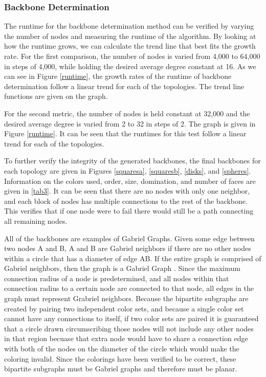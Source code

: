 \documentclass{article}
\begin{document}
        \subsubsection{Backbone Determination}
        The runtime for the backbone determination method can be verified by varying the number of nodes and measuring the runtime of the algorithm. By looking at how the runtime grows, we can calculate the trend line that best fits the growth rate. For the first comparison, the number of nodes is varied from 4,000 to 64,000 in steps of 4,000, while holding the desired average degree constant at 16. As we can see in Figure \ref{runtime}, the growth rates of the runtime of backbone determination follow a linear trend for each of the topologies. The trend line functions are given on the graph.
        \par
        For the second metric, the number of nodes is held constant at 32,000 and the desired average degree is varied from 2 to 32 in steps of 2. The graph is given in Figure \ref{runtime}. It can be seen that the runtimes for this test follow a linear trend for each of the topologies.
        \par
        To further verify the integrity of the generated backbones, the final backbones for each topology are given in Figures \ref{squaresa}, \ref{squaresb}, \ref{disks}, and \ref{spheres}. Information on the colors used, order, size, domination, and number of faces are given in \ref{tab3}. It can be seen that there are no nodes with only one neighbor, and each block of nodes has multiple connections to the rest of the backbone. This verifies that if one node were to fail there would still be a path connecting all remaining nodes.
        \par
        All of the backbones are examples of Gabriel Graphs. Given some edge between two nodes A and B, A and B are Gabriel neighbors if there are no other nodes within a circle that has a diameter of edge AB. If the entire graph is comprised of Gabriel neighbors, then the graph is a Gabriel Graph \cite{rggpartition}. Since the maximum connection radius of a node is predetermined, and all nodes within that connection radius to a certain node are connected to that node, all edges in the graph must represent Grabriel neighbors. Because the bipartite subgraphs are created by pairing two independent color sets, and because a single color set cannot have any connections to itself, if two color sets are paired it is guaranteed that a circle drawn circumscribing those nodes will not include any other nodes in that region becuase that extra node would have to share a connection edge with both of the nodes on the diameter of the circle which would make the coloring invalid. Since the colorings have been verified to be correct, these bipartite subgraphs must be Gabriel graphs and therefore must be planar.
\end{document}
